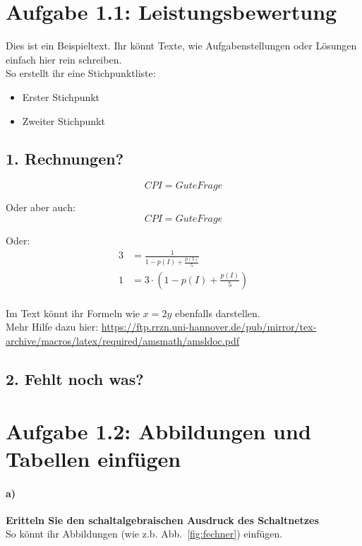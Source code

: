 \documentclass[12pt,a4paper,oneside,ngerman]{article}
\begin{document}
	\section*{Aufgabe 1.1: Leistungsbewertung}
	Dies ist ein Beispieltext. Ihr könnt Texte, wie Aufgabenstellungen oder Lösungen einfach hier rein schreiben.\\
	So erstellt ihr eine Stichpunktliste:
	\begin{itemize}
	    \item Erster Stichpunkt
	    \item Zweiter Stichpunkt
	\end{itemize}
	
	\subsection*{1. Rechnungen?} \label{ex_1_1}
	\begin{equation}
	    CPI= Gute Frage
	\end{equation}
	
	Oder aber auch:\\
	\begin{equation*}
	    CPI= Gute Frage
	\end{equation*}
	
	Oder:\\
	\begin{align*}
	    3 &= \frac{1}{1-p(I)+\frac{p(5)}{5}} \\
	    1 &= 3\cdot (1-p(I)+\frac{p(I)}{5})\\
	\end{align*}
	
	Im Text könnt ihr Formeln wie $x=2y$ ebenfalls darstellen.\\
	
	Mehr Hilfe dazu hier: \url{https://ftp.rrzn.uni-hannover.de/pub/mirror/tex-archive/macros/latex/required/amsmath/amsldoc.pdf}
	
	\subsection*{2. Fehlt noch was?}
	
	\section*{Aufgabe 1.2: Abbildungen und Tabellen einfügen}
	\paragraph{a)} \textbf{Eritteln Sie den schaltalgebraischen Ausdruck des Schaltnetzes}\\
	So könnt ihr Abbildungen (wie z.b. Abb.~\ref{fig:fechner}) einfügen.
	
\end{document}
